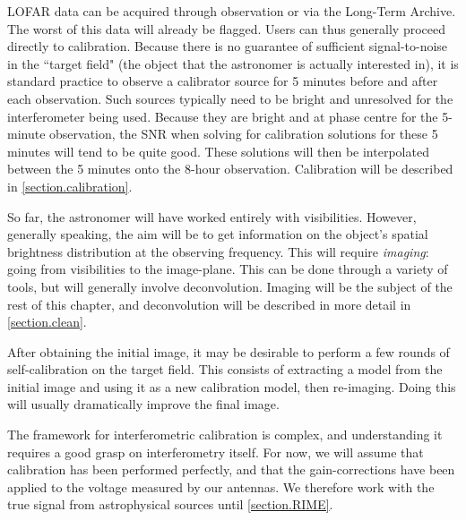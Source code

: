 \pg
LOFAR data can be acquired through observation or via the Long-Term Archive. The worst of this data will already be flagged. Users can thus generally proceed directly to calibration. Because there is no guarantee of sufficient signal-to-noise in the ``target field" (the object that the astronomer is actually interested in), it is standard practice to observe a calibrator source for 5 minutes before and after each observation. Such sources typically need to be bright and unresolved for the interferometer being used. Because they are bright and at phase centre for the 5-minute observation, the SNR when solving for calibration solutions for these 5 minutes will tend to be quite good. These solutions will then be interpolated between the 5 minutes onto the 8-hour observation. Calibration will be described in \cref{section.calibration}.

\pg
So far, the astronomer will have worked entirely with visibilities. However, generally speaking, the aim will be to get information on the object's spatial brightness distribution at the observing frequency. This will require \emph{imaging}: going from visibilities to the image-plane. This can be done through a variety of tools, but will generally involve deconvolution. Imaging will be the subject of the rest of this chapter, and deconvolution will be described in more detail in \cref{section.clean}.

\pg
After obtaining the initial image, it may be desirable to perform a few rounds of self-calibration  on the target field. This consists of extracting a model from the initial image and using it as a new calibration model, then re-imaging. Doing this will usually dramatically improve the final image. 

\pg
The framework for interferometric calibration is complex, and understanding it requires a good grasp on interferometry itself. For now, we will assume that calibration has been performed perfectly, and that the gain-corrections have been applied to the voltage measured by our antennas. We therefore work with the true signal from astrophysical sources until \cref{section.RIME}.